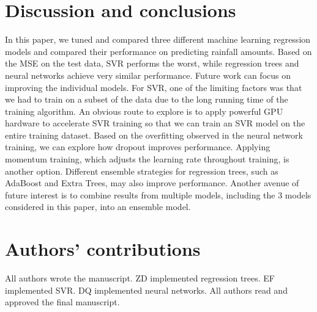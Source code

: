 \documentclass[12pt] {article}
\begin{document}
\section{Discussion and conclusions}
In this paper, we tuned and compared three different machine learning regression models and compared their performance on predicting rainfall amounts. Based on the MSE on the test data, SVR performs the worst, while regression trees and neural networks achieve very similar performance. Future work can focus on improving the individual models. For SVR, one of the limiting factors was that we had to train on a subset of the data due to the long running time of the training algorithm. An obvious route to explore is to apply powerful GPU hardware to accelerate SVR training so that we can train an SVR model on the entire training dataset. Based on the overfitting observed in the neural network training, we can explore how dropout improves performance. Applying momentum training, which adjusts the learning rate throughout training, is another option. Different ensemble strategies for regression trees, such as AdaBoost and Extra Trees, may also improve performance. Another avenue of future interest is to combine results from multiple models, including the 3 models considered in this paper, into an ensemble model.

\section{Authors' contributions}
All authors wrote the manuscript. ZD implemented regression trees. EF implemented SVR. DQ implemented neural networks. All authors read and approved the final manuscript.
\end{document}

